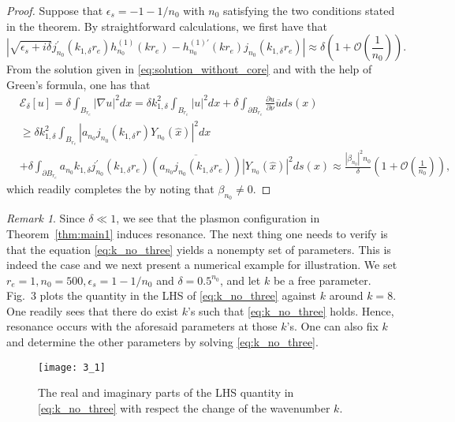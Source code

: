 \documentclass[11pt,reqno,twoside]{amsart}
\theoremstyle{definition}
\theoremstyle{remark}
\newtheorem{rem}{Remark}[section]
\numberwithin{equation}{section}
\begin{document}
\begin{proof}
Suppose that $\epsilon_s=-1-1/n_0$ with $n_0$ satisfying the two conditions stated in the theorem. By straightforward calculations, we first have that
\begin{equation}
  \left|\sqrt{\epsilon_s+i\delta} j_{n_0}^{\prime}(k_{1,\delta}r_e)h_{n_0}^{(1)}(kr_e) - h_{n_0}^{(1)\prime}(kr_e)j_{n_0}(k_{1,\delta}r_e) \right|\approx \delta \left(1+\mathcal{O}\left(\frac{1}{n_0}\right) \right).
\end{equation}
From the solution given in \eqref{eq:solution_without_core} and with the help of Green's formula, one has that
\[
 \begin{split}
   & \mathscr{E}_{\delta}[u] =\delta\int_{B_{r_e}}|\nabla u|^2dx = \delta k_{1,\delta}^2\int_{B_{r_e}}|u|^2dx + \delta\int_{\partial B_{r_e}} \frac{\partial u}{\partial \nu} \overline{u}ds(x)\\
     & \geq \delta k_{1,\delta}^2\int_{B_{r_e}}|a_{n_0} j_{n_0}(k_{1,\delta}r) Y_{n_0}(\hat{x})|^2dx \\
     &  +\delta\int_{\partial B_{r_e}} a_{n_0} k_{1,\delta} j_{n_0}^{\prime}(k_{1,\delta}r_e)  \overline{ \left(a_{n_0}   j_{n_0}(k_{1,\delta}r_e) \right)} |Y_{n_0}(\hat{x})|^2 ds(x) \approx \frac{|\beta_{n_0}|^2 n_0}{\delta}\left(1+\mathcal{O}\left(\frac{1}{n_0}\right) \right),
 \end{split}
\]
which readily completes the by noting that $\beta_{n_0}\neq 0$.
\end{proof}
\begin{rem}\label{rem:2.1}
Since $\delta\ll 1$, we see that the plasmon configuration in Theorem~\ref{thm:main1} induces resonance. The next thing one needs to verify is that the equation \eqref{eq:k_no_three} yields a nonempty set of parameters. This is indeed the case and we next present a numerical example for illustration. We set $r_e=1, n_0=500, \epsilon_s=1-1/n_0$ and $\delta=0.5^{n_0}$, and let $k$ be a free parameter. Fig.~3 plots the quantity in the LHS of \eqref{eq:k_no_three} against $k$ around $k=8$. One readily sees that there do exist $k$'s such that \eqref{eq:k_no_three} holds. Hence, resonance occurs with the aforesaid parameters at those $k$'s. One can also fix $k$ and determine the other parameters by solving \eqref{eq:k_no_three}. 
\end{rem}

\begin{figure}[t]
  \centering
 {\texttt{[image: 3\_1]}}
  \caption{The real and imaginary parts of the LHS quantity in \eqref{eq:k_no_three} with respect the change of the wavenumber $k$. }
  \label{fig:3}
\end{figure}
\end{document}
